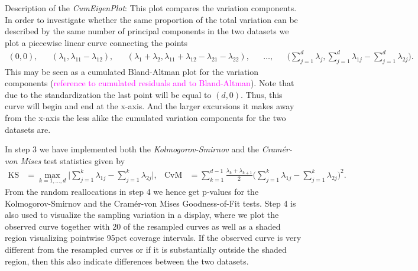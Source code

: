 \documentclass[titlepage,11pt,twoside]{article}
\newcommand{\hl}[1]{\textcolor{magenta}{#1}}
\begin{document}
Description of the \emph{CumEigenPlot}: This plot compares the variation components. 
In order to investigate whether the same proportion of the total variation can be described by the same number of principal components in the two datasets we plot a piecewise linear curve connecting the points
\begin{align*}
(0,0), &&
(\lambda_1,\lambda_{11}-\lambda_{12}), &&
(\lambda_1 + \lambda_2,\lambda_{11}+\lambda_{12}-\lambda_{21}-\lambda_{22}), &&
\ldots, &&
\bigg( \sum_{j=1}^d \lambda_j, \sum_{j=1}^d \lambda_{1j} - \sum_{j=1}^d \lambda_{2j} \bigg).
\end{align*}
This may be seen as a cumulated Bland-Altman plot for the variation components (\hl{reference to cumulated residuals and to Bland-Altman}). Note that due to the standardization the last point will be equal to $(d,0)$. Thus, this curve will begin and end at the x-axis. And the larger excursions it makes away from the x-axis the less alike the cumulated variation components for the two datasets are.

In step 3 we have implemented both the \emph{Kolmogorov-Smirnov} and the \emph{Cram\'er-von Mises} test statistics given by
\begin{align*}
\text{KS} &= \max_{k=1,\dotsc,d} \bigg\lvert \sum_{j=1}^k \lambda_{1j} - \sum_{j=1}^k \lambda_{2j} \bigg\rvert, &
\text{CvM} &= \sum_{k=1}^{d-1} \frac{\lambda_k + \lambda_{k+1}}{2} \bigg( \sum_{j=1}^k \lambda_{1j} - \sum_{j=1}^k \lambda_{2j} \bigg)^2.
\end{align*}
From the random reallocations in step 4 we hence get p-values for the Kolmogorov-Smirnov and the Cram\'er-von Mises Goodness-of-Fit tests. Step 4 is also used to visualize the sampling variation in a display, where we plot the observed curve together with 20 of the resampled curves as well as a shaded region visualizing pointwise 95pct coverage intervals. If the observed curve is very different from the resampled curves or if it is substantially outside the shaded region, then this also indicate differences between the two datasets.

\end{document}
